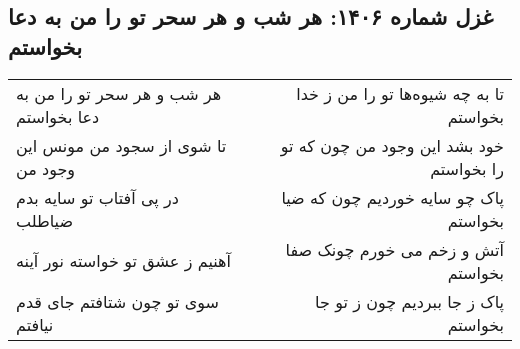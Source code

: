 \begin{center}
\section*{غزل شماره ۱۴۰۶: هر شب و هر سحر تو را من به دعا بخواستم}
\label{sec:1406}
\begin{longtable}{l p{0.5cm} r}
هر شب و هر سحر تو را من به دعا بخواستم
&&
تا به چه شیوه‌ها تو را من ز خدا بخواستم
\\
تا شوی از سجود من مونس این وجود من
&&
خود بشد این وجود من چون که تو را بخواستم
\\
در پی آفتاب تو سایه بدم ضیاطلب
&&
پاک چو سایه خوردیم چون که ضیا بخواستم
\\
آهنیم ز عشق تو خواسته نور آینه
&&
آتش و زخم می خورم چونک صفا بخواستم
\\
سوی تو چون شتافتم جای قدم نیافتم
&&
پاک ز جا ببردیم چون ز تو جا بخواستم
\\
\end{longtable}
\end{center}

